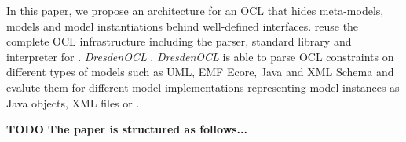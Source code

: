 	In this paper, we propose an architecture for an OCL
	 that hides meta-models,
	models and model instantiations behind well-defined interfaces.  reuse
	 the complete OCL infrastructure including the parser, standard library
	and interpreter for .  \textit{DresdenOCL}
	\cite{WWW:dresdenOCL}. \textit{DresdenOCL} is able to parse OCL
	constraints on different types of models such as UML, EMF Ecore, Java and XML Schema 
	and evalute them for different model implementations representing model
	instances as Java objects, XML files or .
	
	\textbf{TODO The paper is structured as follows...}